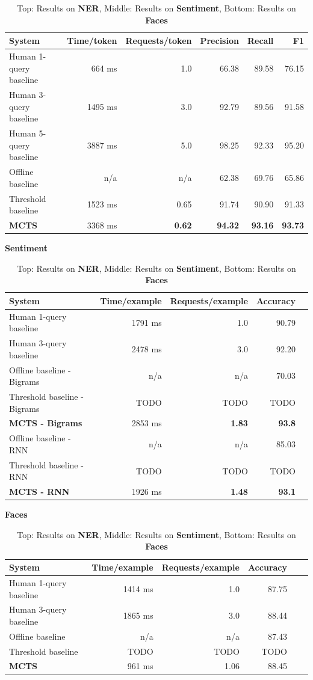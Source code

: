 \begin{table}[ht]
\begin{tabular}{l r r r r r}
    \textbf{System} & \textbf{Time/token} & \textbf{Requests/token} & \textbf{Precision} & \textbf{Recall} & \textbf{F1} \\ \hline
    Human 1-query baseline & 664 ms & 1.0 & 66.38 & 89.58 & 76.15 \\ %
    Human 3-query baseline & 1495 ms & 3.0 & 92.79 & 89.56 & 91.58 \\ %
    Human 5-query baseline & 3887 ms & 5.0 & 98.25 & 92.33 & 95.20 \\ %
    Offline baseline & n/a & n/a & 62.38 & 69.76 & 65.86 \\ %
    Threshold baseline & 1523 ms & 0.65 & 91.74 & 90.90 & 91.33 \\ %
    \textbf{MCTS} & 3368 ms & \textbf{0.62} & \textbf{94.32} & \textbf{93.16} & \textbf{93.73} \\ %
\end{tabular}

{\bf Sentiment}\\
\begin{tabular}{l  r  r  r  r}
    \textbf{System} & \textbf{Time/example} & \textbf{Requests/example} & \textbf{Accuracy} \\ \hline
    Human 1-query baseline & 1791 ms & 1.0 & 90.79 \\ %
    Human 3-query baseline & 2478 ms & 3.0 & 92.20 \\ %
    Offline baseline - Bigrams & n/a & n/a & 70.03 \\ %
    Threshold baseline - Bigrams & TODO & TODO & TODO \\ %
    \textbf{MCTS - Bigrams} & 2853 ms & \textbf{1.83} & \textbf{93.8} \\%
    Offline baseline - RNN & n/a & n/a & 85.03 \\ %
    Threshold baseline - RNN & TODO & TODO & TODO \\ %
    \textbf{MCTS - RNN} & 1926 ms & \textbf{1.48} & \textbf{93.1} \\ %
\end{tabular}

{\bf Faces}\\
\begin{tabular}{l  r  r  r  r  r}
    \textbf{System} & \textbf{Time/example} & \textbf{Requests/example} & \textbf{Accuracy} \\ \hline
    Human 1-query baseline & 1414 ms & 1.0 & 87.75 \\ %
    Human 3-query baseline & 1865 ms & 3.0 & 88.44 \\ %
    Offline baseline & n/a & n/a & 87.43 \\    %
    Threshold baseline & TODO & TODO & TODO \\ %
    \textbf{MCTS} & 961 ms & 1.06 & 88.45 \\   %
\end{tabular}
  \caption{Top: Results on {\bf NER}, Middle: Results on {\bf Sentiment}, Bottom: Results on {\bf Faces}}
\end{table}

